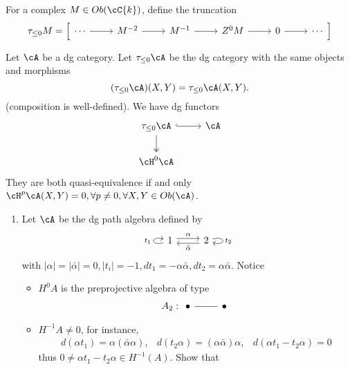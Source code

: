 For a complex $ M\in Ob(\cC{k}) $, define the truncation 
\[ \tau_{\leq0}M = \left[\begin{tikzcd} 
\cdots \ar[r] & M^{-2} \ar[r] & M^{-1} \ar[r] & Z^{0}M \ar[r] & 0 \ar[r] & \cdots
\end{tikzcd}\right] \]

\begin{eg}[dg functors]
Let $ \cA $ be a dg category. Let $ \tau_{\leq0}\cA $ be the dg category with the same objects and morphisms
\[ (\tau_{\leq0}\cA)(X,Y) = \tau_{\leq0}\cA(X,Y). \]
(composition is well-defined). We have dg functors
\[\begin{tikzcd}
\tau_{\leq0}\cA \ar[r, hook] \ar[d, two heads] & \cA \\
\cH^{0}\cA &
\end{tikzcd}\]
They are both quasi-equivalence if and only $ \cH^{p}\cA(X,Y) = 0, \forall p\neq 0, \forall X,Y\in Ob(\cA) $.
\end{eg}

\begin{ex}
\begin{enumerate}
    \item Let $ \cA $ be the dg path algebra defined by 
    \[ \begin{tikzcd}
    1\ar[loop left,"t_{1}"]\ar[r, shift left,"\alpha"] & 2 \ar[l,shift left,"\bar{\alpha}" ] \ar[loop right,"t_{2}"]  
    \end{tikzcd}\]
    with $ \vert\alpha\vert=\vert\bar{\alpha}\vert=0, \vert t_{i} \vert =-1, dt_{1}=-\alpha\bar{\alpha}, dt_{2}=\alpha\bar{\alpha} $. 
    Notice 
    \begin{itemize}
        \item $ H^{0}A $ is the preprojective algebra of type 
        \[ A_{2}: \begin{tikzcd}
        \bullet \ar[r, dash] & \bullet
        \end{tikzcd}\]
        \item $ H^{-1}A \neq 0 $, for instance, 
        \[ \begin{array}{lll}
            d(\alpha t_{1}) = \alpha(\bar{\alpha}\alpha), & d(t_{2}\alpha) = (\alpha\bar{\alpha})\alpha, & d(\alpha t_{1}-t_{2}\alpha) = 0 
        \end{array}  \]
        thus $ 0 \neq \alpha t_{1}-t_{2}\alpha \in H^{-1}(A) $. Show that 
    \end{itemize}
\end{enumerate}
\end{ex}


